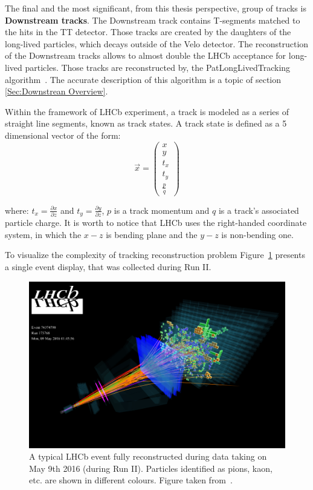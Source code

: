The final and the most significant, from this thesis perspective, group of tracks is \textbf{Downstream tracks}. The Downstream track contains T-segments matched to the hits in the TT detector. Those tracks are created by the daughters of the long-lived particles, which decays outside of the Velo detector. The reconstruction of the Downstream tracks allows to almost double the LHCb acceptance for long-lived particles. Those tracks are reconstructed by, the PatLongLivedTracking algorithm~\cite{PATLLT}. 
The accurate description of this algorithm is a topic of section \ref{Sec:Downstrean Overview}. 

Within the framework of LHCb experiment, a track is modeled as a series of straight line segments, known as track states. A track state is defined as a 5 dimensional vector of the form:
\begin{equation}
    \vec{x} = \begin{pmatrix}
    x \\ y \\ t_{x} \\ t_{y} \\ \frac{p}{q} 
    \end{pmatrix}
\end{equation}

where: $t_x = \frac{\partial x}{\partial z}$ and $t_y = \frac{\partial y}{\partial z}$, $p$ is a track momentum and $q$ is a track's associated particle charge. It is worth to notice that LHCb uses the right-handed coordinate system, in which the $x-z$ is bending plane and the $y-z$ is non-bending one. 


To visualize the complexity of tracking reconstruction problem Figure~\ref{fig:event display} presents a single event display, that was collected during Run II.   

\begin{figure}[h]
\centering
\includegraphics[scale=0.9]{figures/LHCb7_event.png}
\caption{A typical LHCb event fully reconstructed during data taking on May 9th 2016 (during Run II). Particles identified as pions, kaon, etc. are shown in different colours. Figure taken from~\cite{LHCb_event_display}.
\label{fig:event display}}
\end{figure}

